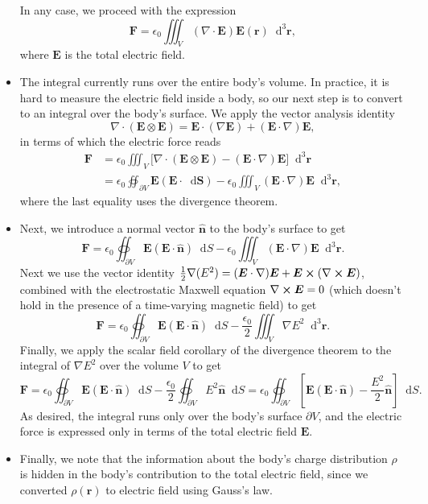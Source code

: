 \documentclass[11pt, a4paper]{article}
\newcommand{\diff}{\mathop{}\!\mathrm{d}} %
\newcommand{\dr}{\diff^{3} \r}  %
\renewcommand{\vec}[1]{\bm{#1}} %
\newcommand{\uvec}[1]{\hat{\vec{#1}}} %
\renewcommand{\r}{\vec{r}}
\newcommand{\E}{\vec{E}} %
\newcommand{\ee}{\epsilon_{0}}  %
\renewcommand{\div}{\nabla \cdot}
\renewcommand{\curl}{\nabla \cross}
\renewcommand{\grad}{\nabla}
\begin{document}
\begin{itemize}
	In any case, we proceed with the expression
	\begin{equation*}
		\vec{F} = \ee \iiint_{V} (\div \E) \E(\r) \dr,
	\end{equation*}
	where $ \E $ is the total electric field.
	

	\item The integral currently runs over the entire body's volume. In practice, it is hard to measure the electric field inside a body, so our next step is to convert to an integral over the body's surface. We apply the vector analysis identity
	\begin{equation*}
		\div (\E \otimes \E) = \E \cdot (\grad \E) + (\E \cdot \grad) \E,
	\end{equation*}
	in terms of which the electric force reads
	\begin{align*}
		\vec{F} &= \ee \iiint_{V} \big[\div (\E \otimes \E) - (\E \cdot \grad) \E \big] \dr \\
		& = \ee \oiint_{\partial V} \E(\E \cdot \diff \vec{S}) - \ee \iiint_{V}(\E \cdot \grad)\E \dr,
	\end{align*}
	where the last equality uses the divergence theorem. 
	
	\item Next, we introduce a normal vector $ \uvec{n} $ to the body's surface to get
	\begin{equation*}
		\vec{F} = \ee \oiint_{\partial V} \E (\E \cdot \uvec{n}) \diff S - \ee \iiint_{V} (\E \cdot \grad)\E \dr.
	\end{equation*}
	Next we use the vector identity $ \frac{1}{2} \grad (E^{2}) = (\E \cdot \grad)\E + \E \cross (\curl \E) $, combined with the electrostatic Maxwell equation $ \curl \E = 0 $ (which doesn't hold in the presence of a time-varying magnetic field) to get
	\begin{equation*}
		\vec{F} = \ee \oiint_{\partial V} \E (\E \cdot \uvec{n}) \diff S - \frac{\ee}{2} \iiint_{V} \grad E^{2}\dr.
	\end{equation*}
	Finally, we apply the scalar field corollary of the divergence theorem to the integral of $ \grad E^{2} $ over the volume $ V $ to get
	\begin{equation*}
		\vec{F} = \ee \oiint_{\partial V} \E (\E \cdot \uvec{n}) \diff S - \frac{\ee}{2} \oiint_{\partial V}E^{2}\uvec{n} \diff S = \ee \oiint_{\partial V} \left[\E(\E\cdot \uvec{n}) - \frac{E^{2}}{2}\uvec{n} \right] \diff S.
	\end{equation*}
	As desired, the integral runs only over the body's surface $ \partial V $, and the electric force is expressed only in terms of the total electric field $ \E $.
	
	\item Finally, we note that the information about the body's charge distribution $ \rho $ is hidden in the body's contribution to the total electric field, since we converted $ \rho(\r) $ to electric field using Gauss's law.
	
\end{itemize}
\end{document}
